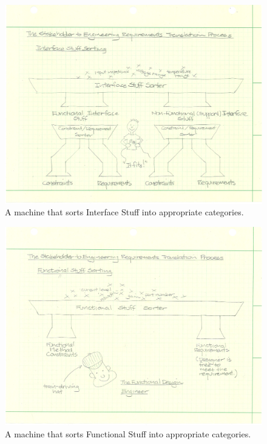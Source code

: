 \begin{figure}[tb]
\centering
\includegraphics[angle=0,width=15cm]{InterfaceSorting.pdf}
\caption{\label{fig:InterfaceSorting} A machine that sorts Interface Stuff into appropriate categories.}
\end{figure}

\begin{figure}[tb]
\centering
\includegraphics[angle=0,width=15cm]{FunctionalSorting.pdf}
\caption{\label{fig:FunctionalSorting} A machine that sorts Functional Stuff into appropriate categories.}
\end{figure} 

